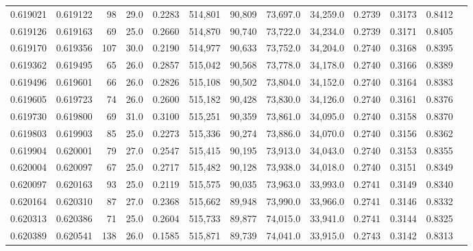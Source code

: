 \begin{tabular}{rrrrrrrrrrrrr}
0.619021 & 0.619122 &    98 & 29.0 &                                     0.2283 & 514,801 &  90,809 &  73,697.0 &  34,259.0 & 0.2739 & 0.3173 & 0.8412 \\
0.619126 & 0.619163 &    69 & 25.0 &                                     0.2660 & 514,870 &  90,740 &  73,722.0 &  34,234.0 & 0.2739 & 0.3171 & 0.8405 \\
0.619170 & 0.619356 &   107 & 30.0 &                                     0.2190 & 514,977 &  90,633 &  73,752.0 &  34,204.0 & 0.2740 & 0.3168 & 0.8395 \\
0.619362 & 0.619495 &    65 & 26.0 &                                     0.2857 & 515,042 &  90,568 &  73,778.0 &  34,178.0 & 0.2740 & 0.3166 & 0.8389 \\
0.619496 & 0.619601 &    66 & 26.0 &                                     0.2826 & 515,108 &  90,502 &  73,804.0 &  34,152.0 & 0.2740 & 0.3164 & 0.8383 \\
0.619605 & 0.619723 &    74 & 26.0 &                                     0.2600 & 515,182 &  90,428 &  73,830.0 &  34,126.0 & 0.2740 & 0.3161 & 0.8376 \\
0.619730 & 0.619800 &    69 & 31.0 &                                     0.3100 & 515,251 &  90,359 &  73,861.0 &  34,095.0 & 0.2740 & 0.3158 & 0.8370 \\
0.619803 & 0.619903 &    85 & 25.0 &                                     0.2273 & 515,336 &  90,274 &  73,886.0 &  34,070.0 & 0.2740 & 0.3156 & 0.8362 \\
0.619904 & 0.620001 &    79 & 27.0 &                                     0.2547 & 515,415 &  90,195 &  73,913.0 &  34,043.0 & 0.2740 & 0.3153 & 0.8355 \\
0.620004 & 0.620097 &    67 & 25.0 &                                     0.2717 & 515,482 &  90,128 &  73,938.0 &  34,018.0 & 0.2740 & 0.3151 & 0.8349 \\
0.620097 & 0.620163 &    93 & 25.0 &                                     0.2119 & 515,575 &  90,035 &  73,963.0 &  33,993.0 & 0.2741 & 0.3149 & 0.8340 \\
0.620164 & 0.620310 &    87 & 27.0 &                                     0.2368 & 515,662 &  89,948 &  73,990.0 &  33,966.0 & 0.2741 & 0.3146 & 0.8332 \\
0.620313 & 0.620386 &    71 & 25.0 &                                     0.2604 & 515,733 &  89,877 &  74,015.0 &  33,941.0 & 0.2741 & 0.3144 & 0.8325 \\
0.620389 & 0.620541 &   138 & 26.0 &                                     0.1585 & 515,871 &  89,739 &  74,041.0 &  33,915.0 & 0.2743 & 0.3142 & 0.8313 \\

\end{tabular}
